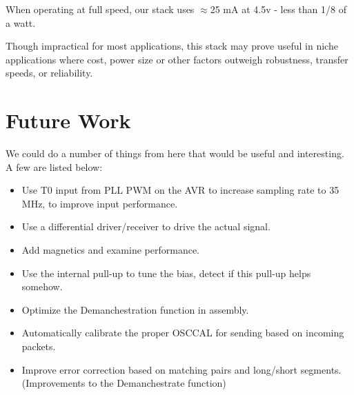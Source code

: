 \documentclass[13pt]{ltxdoc}
\begin{document}
When operating at full speed, our stack uses $\approx$25 mA at 4.5v - less than 1/8 of a watt.

Though impractical for most applications, this stack may prove useful in niche applications where 
cost, power size or other factors outweigh robustness, transfer speeds, or reliability.

\section{Future Work}
We could do a number of things from here that would be useful and interesting.  A few are listed below:

\begin{itemize}
\item Use T0 input from PLL PWM on the AVR to increase sampling rate to 35 MHz, to improve input performance.
\item Use a differential driver/receiver to drive the actual signal.
\item Add magnetics and examine performance.
\item Use the internal pull-up to tune the bias, detect if this pull-up helps somehow.
\item Optimize the Demanchestration function in assembly.
\item Automatically calibrate the proper OSCCAL for sending based on incoming packets.
\item Improve error correction based on matching pairs and long/short segments. (Improvements to the Demanchestrate function)
\end{itemize}
\end{document}
